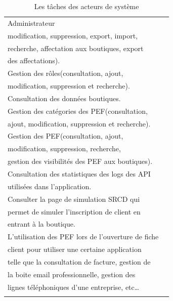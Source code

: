 \begin{longtable}[c]{|l|l|}
	Administrateur               & \begin{tabular}[c]{@{}l@{}}\tabitem Gestion des utilisateurs(consultation, ajout,\\ modification, suppression, export, import,\\ recherche, affectation aux boutiques, export\\ des affectations).\\ \tabitem Gestion des rôles(consultation, ajout,\\ modification, suppression et recherche).\\ \tabitem Consultation des données boutiques.\\ \tabitem Gestion des catégories des PEF(consultation,\\ ajout, modification, suppression et recherche).\\ \tabitem Gestion des PEF(consultation, ajout,\\ modification, suppression, recherche,\\ gestion des visibilités des PEF aux boutiques).\\ \tabitem Consultation des statistiques des logs des API\\ utilisées dans l’application.\\ \tabitem Consulter la page de simulation SRCD qui\\ permet de simuler l’inscription de client en\\ entrant à la boutique.\\ \tabitem L’utilisation des PEF lors de l’ouverture de fiche\\ client pour utiliser une certaine application\\ telle que la consultation de facture, gestion de\\ la boite email professionnelle, gestion des\\ lignes téléphoniques d’une entreprise, etc…\end{tabular} \\ \hline
	\captionsetup{justification=centering}
	\caption{Les tâches des acteurs de système}
	\label{tab:my-table}\\
\end{longtable}

